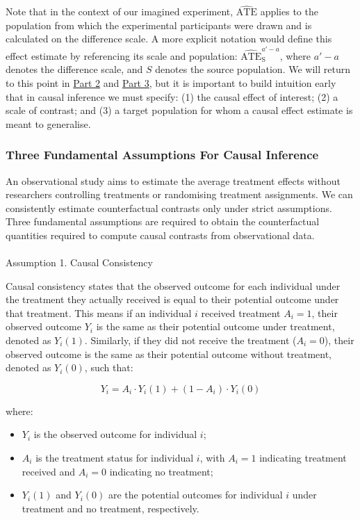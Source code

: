 \documentclass[
  single column]{article}
\makeatletter
\let\oldparagraph\paragraph
\renewcommand{\paragraph}{
    \@ifstar
      \xxxParagraphStar
      \xxxParagraphNoStar
  }
\newcommand{\xxxParagraphStar}[1]{\oldparagraph*{#1}\mbox{}}
\newcommand{\xxxParagraphNoStar}[1]{\oldparagraph{#1}\mbox{}}
\providecommand{\tightlist}{%
  \setlength{\itemsep}{0pt}\setlength{\parskip}{0pt}}\usepackage{longtable,booktabs,array}
\makeatother
\begin{document}
Note that in the context of our imagined experiment,
\(\widehat{\text{ATE}}\) applies to the population from which the
experimental participants were drawn and is calculated on the difference
scale. A more explicit notation would define this effect estimate by
referencing its scale and population:
\(\widehat{\text{ATE}}^{a'-a}_{\text{S}}\), where \(a'-a\) denotes the
difference scale, and \(S\) denotes the source population. We will
return to this point in \hyperref[id-sec-2]{Part 2} and
\hyperref[id-sec-3]{Part 3}, but it is important to build intuition
early that in causal inference we must specify: (1) the causal effect of
interest; (2) a scale of contrast; and (3) a target population for whom
a causal effect estimate is meant to generalise.

\subsubsection{Three Fundamental Assumptions For Causal
Inference}\label{three-fundamental-assumptions-for-causal-inference}

An observational study aims to estimate the average treatment effects
without researchers controlling treatments or randomising treatment
assignments. We can consistently estimate counterfactual contrasts only
under strict assumptions. Three fundamental assumptions are required to
obtain the counterfactual quantities required to compute causal
contrasts from observational data.

\paragraph{Assumption 1. Causal
Consistency}\label{assumption-1.-causal-consistency}

Causal consistency states that the observed outcome for each individual
under the treatment they actually received is equal to their potential
outcome under that treatment. This means if an individual \(i\) received
treatment \(A_i = 1\), their observed outcome \(Y_i\) is the same as
their potential outcome under treatment, denoted as \(Y_i(1)\).
Similarly, if they did not receive the treatment (\(A_i = 0\)), their
observed outcome is the same as their potential outcome without
treatment, denoted as \(Y_i(0)\), such that:

\[
Y_i = A_i \cdot Y_i(1) + (1 - A_i) \cdot Y_i(0)
\]

where:

\begin{itemize}
\tightlist
\item
  \(Y_i\) is the observed outcome for individual \(i\);
\item
  \(A_i\) is the treatment status for individual \(i\), with \(A_i = 1\)
  indicating treatment received and \(A_i = 0\) indicating no treatment;
\item
  \(Y_i(1)\) and \(Y_i(0)\) are the potential outcomes for individual
  \(i\) under treatment and no treatment, respectively.
\end{itemize}
\end{document}
